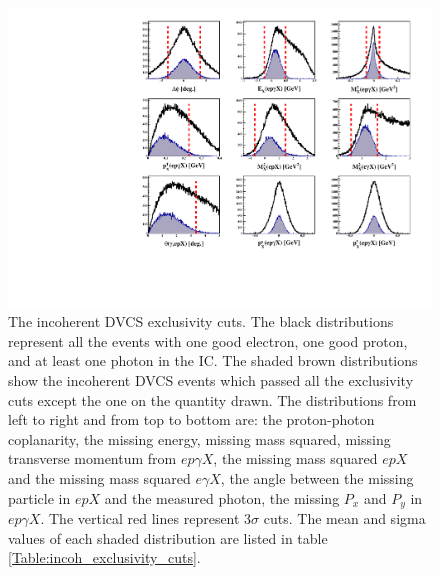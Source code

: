 \begin{figure}[h!]
\centering
\includegraphics[scale=0.9]{fig_Dec2016/all_incoh_exc_cuts.pdf}
\caption{The incoherent DVCS exclusivity cuts. The black distributions 
   represent all the events with one good electron, one good proton, and at 
   least one photon in the IC. The shaded brown distributions show the 
   incoherent DVCS events which passed all the exclusivity cuts except the one 
   on the quantity drawn. The distributions from left to right and from top to 
   bottom are: the proton-photon coplanarity, the missing energy, missing mass 
   squared, missing transverse momentum from $ep\gamma X$, the missing mass 
   squared $epX$ and the missing mass squared $e\gamma X$, the angle between 
   the missing particle in $epX$ and the measured photon, the missing $P_{x}$ 
   and $P_{y}$ in $ep\gamma X$. The vertical red lines represent 3$\sigma$ 
   cuts. The mean and sigma values of each shaded distribution are listed in 
table \ref{Table:incoh_exclusivity_cuts}.} \label{fig:incoh_exclusivty_cuts}
\end{figure}

